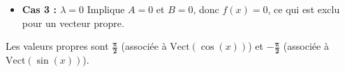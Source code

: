 \documentclass[french]{yLectureNote}
\begin{document}
\begin{enumerate}
\begin{itemize}
        \item \textbf{Cas 3 : $\lambda = 0$}
        Implique $A=0$ et $B=0$, donc $f(x)=0$, ce qui est exclu pour un vecteur propre.
    \end{itemize}
    Les valeurs propres sont $\mathbf{\frac{\pi}{2}}$ (associée à $\text{Vect}(\cos(x))$) et $\mathbf{-\frac{\pi}{2}}$ (associée à $\text{Vect}(\sin(x))$).
\end{enumerate}
\end{document}
